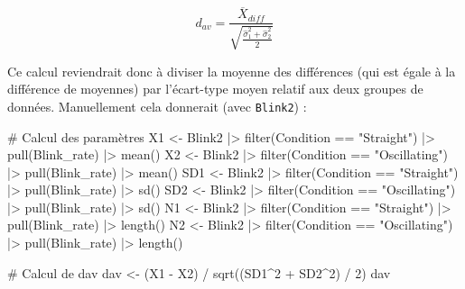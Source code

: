 \documentclass[
  letterpaper,
]{book}
\newenvironment{Shaded}{\begin{snugshade}}{\end{snugshade}}
\newcommand{\CommentTok}[1]{\textcolor[rgb]{0.37,0.37,0.37}{#1}}
\newcommand{\DecValTok}[1]{\textcolor[rgb]{0.68,0.00,0.00}{#1}}
\newcommand{\FunctionTok}[1]{\textcolor[rgb]{0.28,0.35,0.67}{#1}}
\newcommand{\NormalTok}[1]{\textcolor[rgb]{0.00,0.23,0.31}{#1}}
\newcommand{\OtherTok}[1]{\textcolor[rgb]{0.00,0.23,0.31}{#1}}
\newcommand{\SpecialCharTok}[1]{\textcolor[rgb]{0.37,0.37,0.37}{#1}}
\newcommand{\StringTok}[1]{\textcolor[rgb]{0.13,0.47,0.30}{#1}}
\begin{document}
\[d_{av} = \frac{\overline{X} _{diff}}{\sqrt{\frac{\hat{\sigma}_{1}^2 + \hat{\sigma}_{2}^2} {2}}}\]

Ce calcul reviendrait donc à diviser la moyenne des différences (qui est
égale à la différence de moyennes) par l'écart-type moyen relatif aux
deux groupes de données. Manuellement cela donnerait (avec
\texttt{Blink2}) :

\begin{Shaded}
\begin{Highlighting}[]
\CommentTok{\# Calcul des paramètres}
\NormalTok{X1 }\OtherTok{\textless{}{-}}\NormalTok{ Blink2 }\SpecialCharTok{|\textgreater{}} \FunctionTok{filter}\NormalTok{(Condition }\SpecialCharTok{==} \StringTok{"Straight"}\NormalTok{) }\SpecialCharTok{|\textgreater{}} \FunctionTok{pull}\NormalTok{(Blink\_rate) }\SpecialCharTok{|\textgreater{}} \FunctionTok{mean}\NormalTok{()}
\NormalTok{X2 }\OtherTok{\textless{}{-}}\NormalTok{ Blink2 }\SpecialCharTok{|\textgreater{}} \FunctionTok{filter}\NormalTok{(Condition }\SpecialCharTok{==} \StringTok{"Oscillating"}\NormalTok{) }\SpecialCharTok{|\textgreater{}} \FunctionTok{pull}\NormalTok{(Blink\_rate) }\SpecialCharTok{|\textgreater{}} \FunctionTok{mean}\NormalTok{()}
\NormalTok{SD1 }\OtherTok{\textless{}{-}}\NormalTok{ Blink2 }\SpecialCharTok{|\textgreater{}} \FunctionTok{filter}\NormalTok{(Condition }\SpecialCharTok{==} \StringTok{"Straight"}\NormalTok{) }\SpecialCharTok{|\textgreater{}} \FunctionTok{pull}\NormalTok{(Blink\_rate) }\SpecialCharTok{|\textgreater{}} \FunctionTok{sd}\NormalTok{()}
\NormalTok{SD2 }\OtherTok{\textless{}{-}}\NormalTok{ Blink2 }\SpecialCharTok{|\textgreater{}} \FunctionTok{filter}\NormalTok{(Condition }\SpecialCharTok{==} \StringTok{"Oscillating"}\NormalTok{) }\SpecialCharTok{|\textgreater{}} \FunctionTok{pull}\NormalTok{(Blink\_rate) }\SpecialCharTok{|\textgreater{}} \FunctionTok{sd}\NormalTok{()}
\NormalTok{N1 }\OtherTok{\textless{}{-}}\NormalTok{ Blink2 }\SpecialCharTok{|\textgreater{}} \FunctionTok{filter}\NormalTok{(Condition }\SpecialCharTok{==} \StringTok{"Straight"}\NormalTok{) }\SpecialCharTok{|\textgreater{}} \FunctionTok{pull}\NormalTok{(Blink\_rate) }\SpecialCharTok{|\textgreater{}} \FunctionTok{length}\NormalTok{()}
\NormalTok{N2 }\OtherTok{\textless{}{-}}\NormalTok{ Blink2 }\SpecialCharTok{|\textgreater{}} \FunctionTok{filter}\NormalTok{(Condition }\SpecialCharTok{==} \StringTok{"Oscillating"}\NormalTok{) }\SpecialCharTok{|\textgreater{}} \FunctionTok{pull}\NormalTok{(Blink\_rate) }\SpecialCharTok{|\textgreater{}} \FunctionTok{length}\NormalTok{()}

\CommentTok{\# Calcul de dav}
\NormalTok{dav }\OtherTok{\textless{}{-}}\NormalTok{ (X1 }\SpecialCharTok{{-}}\NormalTok{ X2) }\SpecialCharTok{/} \FunctionTok{sqrt}\NormalTok{((SD1}\SpecialCharTok{\^{}}\DecValTok{2} \SpecialCharTok{+}\NormalTok{ SD2}\SpecialCharTok{\^{}}\DecValTok{2}\NormalTok{) }\SpecialCharTok{/} \DecValTok{2}\NormalTok{)}
\NormalTok{dav}
\end{Highlighting}
\end{Shaded}
\end{document}
